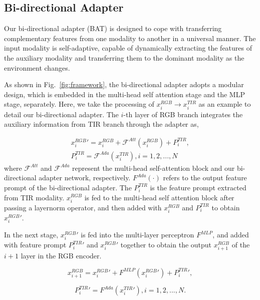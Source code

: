 \documentclass[letterpaper]{article} %
\begin{document}
\subsection{Bi-directional Adapter}

Our bi-directional adapter (BAT) is designed to cope with transferring complementary features from one modality to another in a universal manner. 
The input modality is self-adaptive, capable of dynamically extracting the features of the auxiliary modality and transferring them to the dominant modality as the environment changes.

As shown in Fig.~\ref{fig:framework}, the bi-directional adapter adopts a modular design, which is embedded in the multi-head self attention stage and the MLP stage, separately. Here, we take the processing of $x_{i}^{RGB}\rightarrow x_{i}^{TIR}$ as an example to detail our bi-directional adapter. The $i$-th layer of RGB branch integrates the auxiliary information from TIR branch through the adapter as,

\begin{equation}
\begin{aligned}
   {x_{i}^{RGB}}' = x_{i}^{RGB} + \mathcal{F}^{Att}(x_{i}^{RGB}) + P_{i}^{TIR},\\
    P_{i}^{TIR} = \mathcal{F}^{Ada}(x_{i}^{TIR}),   i = 1,2,...,N 
\end{aligned}
\end{equation}
where $\mathcal{F}^{Att}$ and $\mathcal{F}^{Ada}$ represent the multi-head self-attention block and our bi-directional adapter network, respectively. $F^{Ada}(\cdot)$ refers to the output feature prompt of the bi-directional adapter.
The $P_{i}^{TIR}$ is the feature prompt extracted from TIR modality.  $x_{i}^{RGB}$ is fed to the multi-head self attention block after passing a layernorm operator, and then added with $x_{i}^{RGB}$ and $P_{i}^{TIR}$ to obtain ${x_{i}^{RGB}}'$. 

In the next stage, ${x_{i}^{RGB}}'$ is fed into the multi-layer perceptron $F^{MLP}$, and added with feature prompt ${P_{i}^{TIR}}'$ and ${x_{i}^{RGB}}'$ together to obtain the output $x_{i+1}^{RGB}$ of the $i+1$ layer in the RGB encoder.

\begin{equation}
     x_{i+1}^{RGB} = {x_{i}^{RGB}}' + F^{MLP}({x_{i}^{RGB}}') + {P_{i}^{TIR}}', 
\end{equation}

\begin{equation}
    {P_{i}^{TIR}}' = F^{Ada}({x_{i}^{TIR}}'),   i = 1,2,...,N.
\end{equation}
\end{document}

